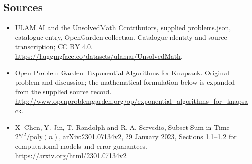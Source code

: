 \documentclass[11pt,a4paper]{article}
\begin{document}
\subsection{Sources}
\begin{itemize}
\item[S1] ULAM.AI and the UnsolvedMath Contributors, supplied problems.json, catalogue entry, OpenGarden collection. Catalogue identity and source transcription; CC BY 4.0.
\url{https://huggingface.co/datasets/ulamai/UnsolvedMath}.
\item[S2] Open Problem Garden, Exponential Algorithms for Knapsack. Original problem and discussion; the mathematical formulation below is expanded from the supplied source record.
\url{http://www.openproblemgarden.org/op/exponential_algorithms_for_knapsack}.
\item[S3] X. Chen, Y. Jin, T. Randolph and R. A. Servedio, Subset Sum in Time $2^{n/2}/\mathrm{poly}(n)$, arXiv:2301.07134v2, 29 January 2023, Sections 1.1--1.2 for computational models and error guarantees.
\url{https://arxiv.org/html/2301.07134v2}.
\end{itemize}
\end{document}
